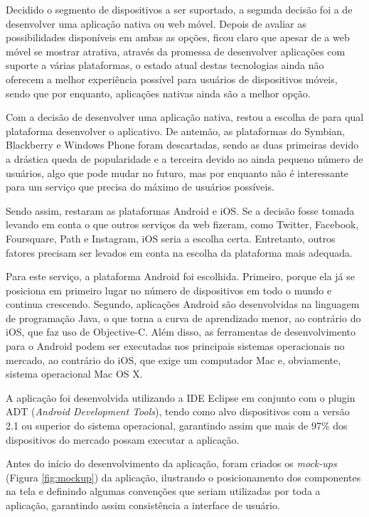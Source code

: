 \documentclass[diss]{template/setrem}
\begin{document}
Decidido o segmento de dispositivos a ser suportado, a segunda decisão foi a de desenvolver uma aplicação nativa ou web móvel. Depois de avaliar as possibilidades disponíveis em ambas as opções, ficou claro que apesar de a web móvel se mostrar atrativa, através da promessa de desenvolver aplicações com suporte a várias plataformas, o estado atual destas tecnologias ainda não oferecem a melhor experiência possível para usuários de dispositivos móveis, sendo que por enquanto, aplicações nativas ainda são a melhor opção.

Com a decisão de desenvolver uma aplicação nativa, restou a escolha de para qual plataforma desenvolver o aplicativo. De antemão, as plataformas do Symbian, Blackberry e Windows Phone foram descartadas, sendo as duas primeiras devido a drástica queda de popularidade e a terceira devido ao ainda pequeno número de usuários, algo que pode mudar no futuro, mas por enquanto não é interessante para um serviço que precisa do máximo de usuários possíveis.

Sendo assim, restaram as plataformas Android e iOS. Se a decisão fosse tomada levando em conta o que outros serviços da web fizeram, como Twitter, Facebook, Foursquare, Path e Instagram, iOS seria a escolha certa. Entretanto, outros fatores precisam ser levados em conta na escolha da plataforma mais adequada.

Para este serviço, a plataforma Android foi escolhida. Primeiro, porque ela já se posiciona em primeiro lugar no número de dispositivos em todo o mundo e continua crescendo. Segundo, aplicações Android são desenvolvidas na linguagem de programação Java, o que torna a curva de aprendizado menor, ao contrário do iOS, que faz uso de Objective-C. Além disso, as ferramentas de desenvolvimento para o Android podem ser executadas nos principais sistemas operacionais no mercado, ao contrário do iOS, que exige um computador Mac e, obviamente, sistema operacional Mac OS X.

A aplicação foi desenvolvida utilizando a IDE Eclipse em conjunto com o plugin ADT (\emph{Android Development Tools}), tendo como alvo dispositivos com a versão 2.1 ou superior do sistema operacional, garantindo assim que mais de 97\% dos dispositivos do mercado possam executar a aplicação.

Antes do início do desenvolvimento da aplicação, foram criados os \emph{mock-ups} (Figura \ref{fig:mockup}) da aplicação, ilustrando o posicionamento dos componentes na tela e definindo algumas convenções que seriam utilizadas por toda a aplicação, garantindo assim consistência a interface de usuário.
\end{document}
